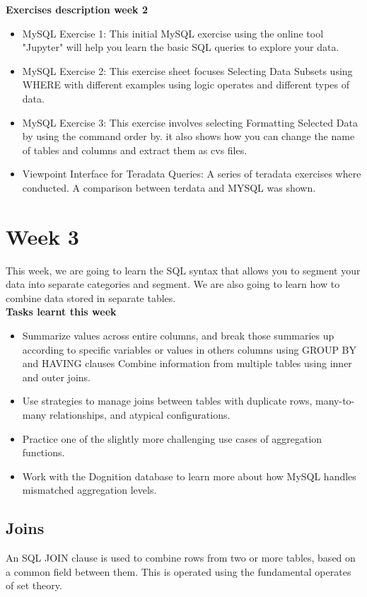 \documentclass{article}
\begin{document}
\noindent \textbf{Exercises description week 2}

\begin{itemize}
\item MySQL Exercise 1: This initial MySQL exercise using the online tool "Jupyter" will help you learn the basic SQL queries to explore your data.
\item  MySQL Exercise 2: This exercise sheet focuses  Selecting Data Subsets using WHERE with different examples using logic operates and different types of data.
\item MySQL Exercise 3: This exercise involves selecting  Formatting Selected Data by using the command order by. it also shows how you can change the name of tables and columns and extract them as cvs files.
\item Viewpoint Interface for Teradata Queries: A series of teradata exercises where conducted. A comparison between terdata and MYSQL was shown. 
\end{itemize}

\pagebreak

\section*{Week 3}
This week, we are going to learn the SQL syntax that allows you to segment your data into separate categories and segment. We are also going to learn how to combine data stored in separate tables.\\

\noindent \textbf{Tasks learnt this week}

\begin{itemize}
\item Summarize values across entire columns, and break those summaries up according to specific variables or values in others columns using GROUP BY and HAVING clauses
Combine information from multiple tables using inner and outer joins.
\item Use strategies to manage joins between tables with duplicate rows, many-to-many relationships, and atypical configurations.
\item Practice one of the slightly more challenging use cases of aggregation functions.
\item Work with the Dognition database to learn more about how MySQL handles mismatched aggregation levels.
\end{itemize}

\subsection*{Joins}
An SQL JOIN clause is used to combine rows from two or more tables, based on a common field between them. This is operated using the fundamental operates of set theory.
\end{document}
